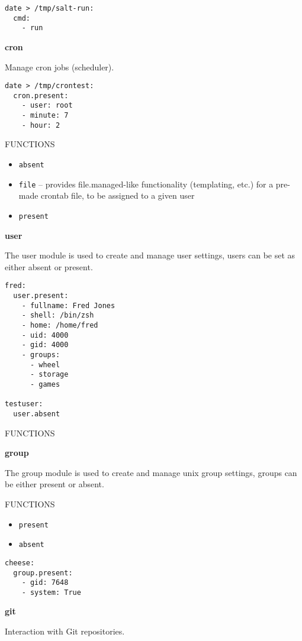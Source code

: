 \documentclass[landscape,a4paper,10pt]{article}
\begin{document}
\begin{multicols}{3}
\begin{verbatim}
date > /tmp/salt-run:
  cmd:
    - run
\end{verbatim}

\bfseries{\LARGE{cron}}

Manage cron jobs (scheduler).

\begin{verbatim}
date > /tmp/crontest:
  cron.present:
    - user: root
    - minute: 7
    - hour: 2
\end{verbatim}

FUNCTIONS

\begin{itemize}
 \item \texttt{absent}
 \item \texttt{file} -- provides file.managed-like functionality (templating, etc.) for a pre-made crontab file, to be assigned to a given user
 \item \texttt{present}
\end{itemize}

\bfseries{\LARGE{user}}

The user module is used to create and manage user settings, users can be set as either absent or present.

\begin{verbatim}
fred:
  user.present:
    - fullname: Fred Jones
    - shell: /bin/zsh
    - home: /home/fred
    - uid: 4000
    - gid: 4000
    - groups:
      - wheel
      - storage
      - games

testuser:
  user.absent
\end{verbatim}

FUNCTIONS

\bfseries{\LARGE{group}}

The group module is used to create and manage unix group settings, groups can be either present or absent.

FUNCTIONS

\begin{itemize}
 \item \texttt{present}
 \item \texttt{absent}
\end{itemize}

\begin{verbatim}
cheese:
  group.present:
    - gid: 7648
    - system: True
\end{verbatim}

\bfseries{\LARGE{git}}

Interaction with Git repositories.


\end{multicols}
\end{document}

